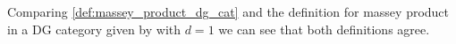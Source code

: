 \begin{remark}

    


\end{remark}

\begin{remark}
    Comparing \autoref{def:massey_product_dg_cat} and the definition for massey product in a DG category given by \cite[Definition 4.2.1]{Jasso-Muro_2023} with \( d = 1 \) we can see that both definitions agree.
\end{remark}
